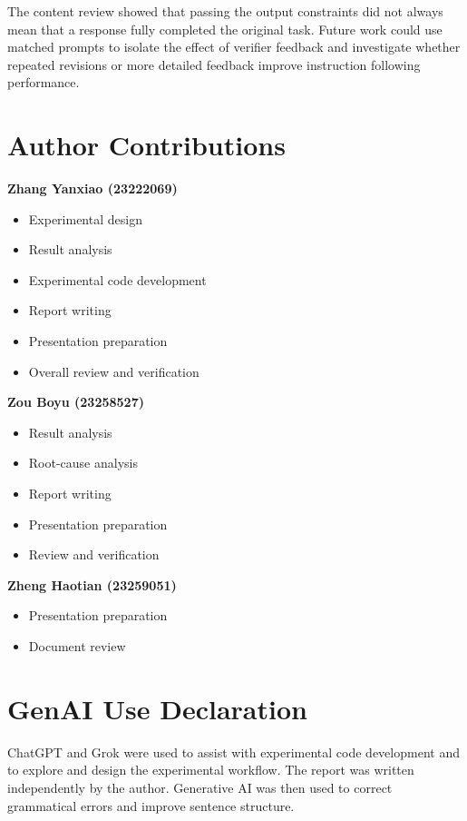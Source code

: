 \documentclass[conference]{IEEEtran}
\begin{document}
The content review showed that passing the output constraints did not always mean that a response fully completed the original task. Future work could use matched prompts to isolate the effect of verifier feedback and investigate whether repeated revisions or more detailed feedback improve instruction following performance.

\section*{Author Contributions}
\noindent\textbf{Zhang Yanxiao (23222069)}
\begin{itemize}
  \item Experimental design
  \item Result analysis
  \item Experimental code development
  \item Report writing
  \item Presentation preparation
  \item Overall review and verification
\end{itemize}

\noindent\textbf{Zou Boyu (23258527)}
\begin{itemize}
  \item Result analysis
  \item Root-cause analysis
  \item Report writing
  \item Presentation preparation
  \item Review and verification
\end{itemize}

\noindent\textbf{Zheng Haotian (23259051)}
\begin{itemize}
  \item Presentation preparation
  \item Document review
\end{itemize}

\section*{GenAI Use Declaration}
ChatGPT and Grok were used to assist with experimental code development and to explore and design the experimental workflow. The report was written independently by the author. Generative AI was then used to correct grammatical errors and improve sentence structure.




\appendices

\end{document}
